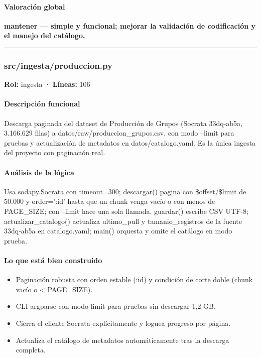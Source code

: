 \paragraph{Valoración global}
\textbf{mantener --- simple y funcional; mejorar la validación de codificación y el manejo del catálogo.}

\medskip
\hrule

\subsubsection{src/ingesta/produccion.py}
\textbf{Rol:} ingesta · \textbf{Líneas:} 106

\paragraph{Descripción funcional}
Descarga paginada del dataset de Producción de Grupos (Socrata 33dq-ab5a, 3.166.629 filas) a datos/raw/produccion\_grupos.csv, con modo --limit para pruebas y actualización de metadatos en datos/catalogo.yaml. Es la única ingesta del proyecto con paginación real.

\paragraph{Análisis de la lógica}
Usa sodapy.Socrata con timeout=300; descargar() pagina con \$offset/\$limit de 50.000 y order=':id' hasta que un chunk venga vacío o con menos de PAGE\_SIZE; con --limit hace una sola llamada. guardar() escribe CSV UTF-8; actualizar\_catalogo() actualiza ultimo\_pull y tamanio\_registros de la fuente 33dq-ab5a en catalogo.yaml; main() orquesta y omite el catálogo en modo prueba.

\paragraph{Lo que está bien construido}
\begin{itemize}
  \item Paginación robusta con orden estable (:id) y condición de corte doble (chunk vacío o < PAGE\_SIZE).
  \item CLI argparse con modo limit para pruebas sin descargar 1,2 GB.
  \item Cierra el cliente Socrata explícitamente y loguea progreso por página.
  \item Actualiza el catálogo de metadatos automáticamente tras la descarga completa.
\end{itemize}


